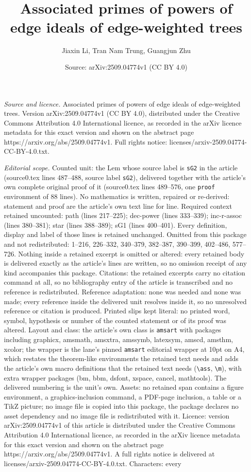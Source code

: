 \documentclass[10pt,a4paper]{amsart}
\title[Associated primes of powers of edge ideals of edge-weighted ]{Associated primes of powers of edge ideals of edge-weighted trees}
\author{Jiaxin Li, Tran Nam Trung, Guangjun Zhu}
\date{Source: arXiv:2509.04774v1 (CC BY 4.0)}
\begin{document}
\maketitle

\noindent\emph{Source and licence.} Associated primes of powers of edge ideals of edge-weighted trees. Version arXiv:2509.04774v1 (CC BY 4.0), distributed under the Creative Commons Attribution 4.0 International licence, as recorded in the arXiv licence metadata for this exact version and shown on the abstract page https://arxiv.org/abs/2509.04774v1. Full rights notice: licenses/arxiv-2509.04774-CC-BY-4.0.txt.\par\smallskip

\noindent\textit{Editorial scope.} Counted unit: the Lem whose source label is \texttt{sG2} in the article (source0.tex lines 487--488, source label \texttt{sG2}), delivered together with the article's own complete original proof of it (source0.tex lines 489--576, one \texttt{proof} environment of 88 lines). No mathematics is written, repaired or re-derived: statement and proof are the article's own text line for line. Required context retained uncounted: path (lines 217--225); dec-power (lines 333--339); inc-r-assoc (lines 380--381); star (lines 388--389); sG1 (lines 400--401). Every definition, display and label of those lines is retained unchanged. Omitted from this package and not redistributed: 1--216, 226--332, 340--379, 382--387, 390--399, 402--486, 577--726. Nothing inside a retained excerpt is omitted or altered: every retained body is delivered exactly as the article's lines are written, so no omission receipt of any kind accompanies this package. Citations: the retained excerpts carry no citation command at all, so no bibliography entry of the article is transcribed and no reference is redistributed. Reference adaptation: none was needed and none was made; every reference inside the delivered unit resolves inside it, so no unresolved reference or citation is produced. Printed slips kept literal: no printed word, symbol, hypothesis or number of the counted statement or of its proof was altered. Layout and class: the article's own class is \texttt{amsart} with packages including graphicx, amsmath, amsxtra, amssymb, latexsym, amscd, amsthm, xcolor; the wrapper is the lane's pinned \texttt{amsart} editorial wrapper at 10pt on A4, which restates the theorem-like environments the retained text needs and adds the article's own macro definitions that the retained text needs (\texttt{\textbackslash ass}, \texttt{\textbackslash m}), with extra wrapper packages (bm, bbm, dsfont, xspace, cancel, mathtools). The delivered numbering is the unit's own. Assets: no retained span contains a figure environment, a graphics-inclusion command, a PDF-page inclusion, a table or a TikZ picture; no image file is copied into this package, the package declares no asset dependency and no image file is redistributed with it. Licence: version arXiv:2509.04774v1 of this article is distributed under the Creative Commons Attribution 4.0 International licence, as recorded in the arXiv licence metadata for this exact version and shown on the abstract page https://arxiv.org/abs/2509.04774v1. A full rights notice is delivered at licenses/arxiv-2509.04774-CC-BY-4.0.txt. Characters: every 
\end{document}
